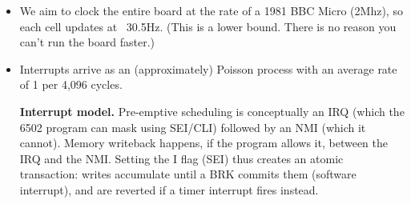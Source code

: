 \documentclass{article}
\begin{document}
\begin{itemize}
  The table from 0xEE00-0xEE3F contains the mapping from $(x,y)$ coordinates to cell indices,
  with $y$ ascending fastest, starting from cell (-3,-3);
  so the byte in 0xEE00$+(y+3)+64(x+3)$ is the index of cell with relative offset $(x,y)$
  for $-3 \leq x,y \leq 3$.
    
\item We aim to clock the entire board at the rate of a 1981 BBC Micro (2Mhz), so each cell updates at ~30.5Hz.
 (This is a lower bound. There is no reason you can't run the board faster.)
\item Interrupts arrive as an (approximately) Poisson process with an average rate of 1 per 4,096 cycles.

  \textbf{Interrupt model.}
  Pre-emptive scheduling is conceptually an IRQ (which the 6502 program can mask using SEI/CLI) followed by an NMI (which it cannot). Memory writeback happens, if the program allows it, between the IRQ and the NMI. Setting the I flag (SEI) thus creates an atomic transaction: writes accumulate until a BRK commits them (software interrupt), and are reverted if a timer interrupt fires instead.


\end{itemize}
\end{document}
